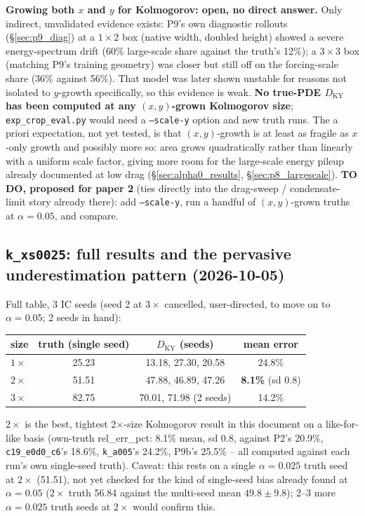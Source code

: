 \documentclass[11pt]{article}
\begin{document}
\textbf{Growing both $x$ and $y$ for Kolmogorov: open, no direct
answer.} Only indirect, unvalidated evidence exists: P9's own
diagnostic rollouts (\S\ref{sec:p9_diag}) at a $1{\times}2$ box (native
width, doubled height) showed a severe energy-spectrum drift (60\%
large-scale share against the truth's 12\%); a $3{\times}3$ box
(matching P9's training geometry) was closer but still off on the
forcing-scale share (36\% against 56\%). That model was later shown
unstable for reasons not isolated to $y$-growth specifically, so this
evidence is weak. \textbf{No true-PDE $D_{\mathrm{KY}}$ has been
computed at any $(x,y)$-grown Kolmogorov size}; \texttt{exp\_crop\_eval.py}
would need a \texttt{--scale-y} option and new truth runs. The a priori
expectation, not yet tested, is that $(x,y)$-growth is at least as
fragile as $x$-only growth and possibly more so: area grows
quadratically rather than linearly with a uniform scale factor, giving
more room for the large-scale energy pileup already documented at low
drag (\S\ref{sec:alpha0_results}, \S\ref{sec:p8_largescale}).
\textbf{TO DO, proposed for paper 2} (ties directly into the drag-sweep
/ condensate-limit story already there): add \texttt{--scale-y}, run a
handful of $(x,y)$-grown truths at $\alpha{=}0.05$, and compare.

\subsection{\texttt{k\_xs0025}: full results and the pervasive
underestimation pattern (2026-10-05)}
\label{sec:k_xs0025_full}

Full table, 3 IC seeds (seed 2 at $3\times$ cancelled, user-directed,
to move on to $\alpha{=}0.05$; 2 seeds in hand):
\begin{center}
\small
\begin{tabular}{lccc}
\toprule
size & truth (single seed) & $D_{\mathrm{KY}}$ (seeds) & mean error \\
\midrule
$1\times$ & 25.23 & 13.18, 27.30, 20.58 & 24.8\% \\
$2\times$ & 51.51 & 47.88, 46.89, 47.26 & \textbf{8.1\%} (sd 0.8) \\
$3\times$ & 82.75 & 70.01, 71.98 (2 seeds) & 14.2\% \\
\bottomrule
\end{tabular}
\end{center}
$2\times$ is the best, tightest 2$\times$-size Kolmogorov result in this
document on a like-for-like basis (own-truth rel\_err\_pct: 8.1\% mean,
sd 0.8, against P2's 20.9\%, \texttt{c19\_e0d0\_c6}'s 18.6\%,
\texttt{k\_a005}'s 24.2\%, P9b's 25.5\% -- all computed against each
run's own single-seed truth). Caveat: this rests on a single
$\alpha{=}0.025$ truth seed at $2\times$ (51.51), not yet checked for
the kind of single-seed bias already found at $\alpha{=}0.05$
($2\times$ truth 56.84 against the multi-seed mean $49.8\pm9.8$);
2--3 more $\alpha{=}0.025$ truth seeds at $2\times$ would confirm this.
\end{document}
